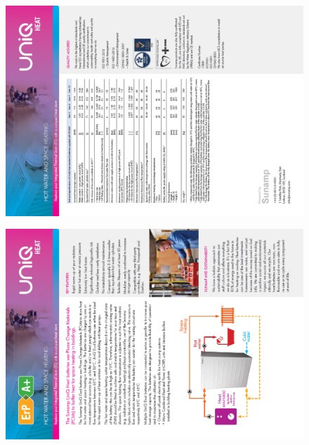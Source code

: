 \newpage
\begin{figure}
	\centering
	\includegraphics[height=0.48\textheight]{Appendices/UniQ_Dual_02.PNG}
	\label{app:dual_mockup}
\end{figure}

\begin{figure}
	\centering
	\includegraphics[height=0.48\textheight]{Appendices/UniQ_Dual_01.PNG}
\end{figure}